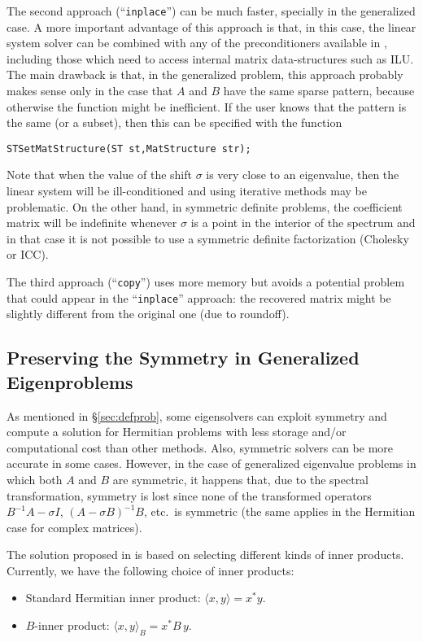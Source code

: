 	The second approach (``\Verb!inplace!'') can be much faster, specially in the generalized case. A more important advantage of this approach is that, in this case, the linear system solver can be combined with any of the preconditioners available in \petsc, including those which need to access internal matrix data-structures such as ILU. The main drawback is that, in the generalized problem, this approach probably makes sense only in the case that $A$ and $B$ have the same sparse pattern, because otherwise the function  might be inefficient. 
If the user knows that the pattern is the same (or a subset), then this can be specified with the function
	\begin{Verbatim}[fontsize=\small]
	STSetMatStructure(ST st,MatStructure str);
	\end{Verbatim}
	
	Note that when the value of the shift $\sigma$ is very close to an eigenvalue, then the linear system will be ill-conditioned and using iterative methods may be problematic. On the other hand, in symmetric definite problems, the coefficient matrix will be indefinite whenever $\sigma$ is a point in the interior of the spectrum and in that case it is not possible to use a symmetric definite factorization (Cholesky or ICC).

	The third approach (``\Verb!copy!'') uses more memory but avoids a potential problem that could appear in the ``\Verb!inplace!'' approach: the recovered matrix might be slightly different from the original one (due to roundoff).

\subsection{Preserving the Symmetry in Generalized Eigenproblems}
\label{sec:symm}

	As mentioned in \S\ref{sec:defprob}, some eigensolvers can exploit symmetry and compute a solution for Hermitian problems with less storage and/or computational cost than other methods. Also, symmetric solvers can be more accurate in some cases. However, in the case of generalized eigenvalue problems in which both $A$ and $B$ are symmetric, it happens that, due to the spectral transformation, symmetry is lost since none of the transformed operators $B^{-1}\!A-\sigma I$, $(A-\sigma B)^{-1}B$, etc.\ is symmetric (the same applies in the Hermitian case for complex matrices).

	The solution proposed in \slepc is based on selecting different kinds of inner products. Currently, we have the following choice of inner products:
  \begin{itemize}
    \item Standard Hermitian inner product: $\langle x,y\rangle=x^*y$.
    \item $B$-inner product: $\langle x,y\rangle_B=x^*\!B\,y$.
  \end{itemize}

